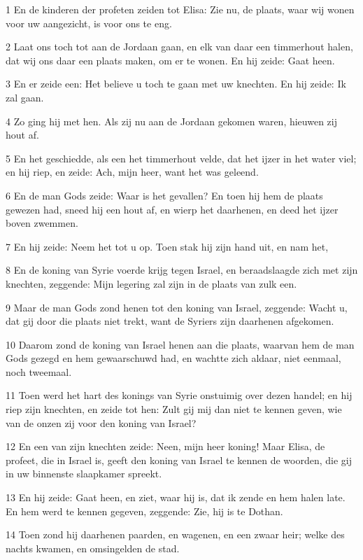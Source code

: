 \par 1 En de kinderen der profeten zeiden tot Elisa: Zie nu, de plaats, waar wij wonen voor uw aangezicht, is voor ons te eng.
\par 2 Laat ons toch tot aan de Jordaan gaan, en elk van daar een timmerhout halen, dat wij ons daar een plaats maken, om er te wonen. En hij zeide: Gaat heen.
\par 3 En er zeide een: Het believe u toch te gaan met uw knechten. En hij zeide: Ik zal gaan.
\par 4 Zo ging hij met hen. Als zij nu aan de Jordaan gekomen waren, hieuwen zij hout af.
\par 5 En het geschiedde, als een het timmerhout velde, dat het ijzer in het water viel; en hij riep, en zeide: Ach, mijn heer, want het was geleend.
\par 6 En de man Gods zeide: Waar is het gevallen? En toen hij hem de plaats gewezen had, sneed hij een hout af, en wierp het daarhenen, en deed het ijzer boven zwemmen.
\par 7 En hij zeide: Neem het tot u op. Toen stak hij zijn hand uit, en nam het,
\par 8 En de koning van Syrie voerde krijg tegen Israel, en beraadslaagde zich met zijn knechten, zeggende: Mijn legering zal zijn in de plaats van zulk een.
\par 9 Maar de man Gods zond henen tot den koning van Israel, zeggende: Wacht u, dat gij door die plaats niet trekt, want de Syriers zijn daarhenen afgekomen.
\par 10 Daarom zond de koning van Israel henen aan die plaats, waarvan hem de man Gods gezegd en hem gewaarschuwd had, en wachtte zich aldaar, niet eenmaal, noch tweemaal.
\par 11 Toen werd het hart des konings van Syrie onstuimig over dezen handel; en hij riep zijn knechten, en zeide tot hen: Zult gij mij dan niet te kennen geven, wie van de onzen zij voor den koning van Israel?
\par 12 En een van zijn knechten zeide: Neen, mijn heer koning! Maar Elisa, de profeet, die in Israel is, geeft den koning van Israel te kennen de woorden, die gij in uw binnenste slaapkamer spreekt.
\par 13 En hij zeide: Gaat heen, en ziet, waar hij is, dat ik zende en hem halen late. En hem werd te kennen gegeven, zeggende: Zie, hij is te Dothan.
\par 14 Toen zond hij daarhenen paarden, en wagenen, en een zwaar heir; welke des nachts kwamen, en omsingelden de stad.
